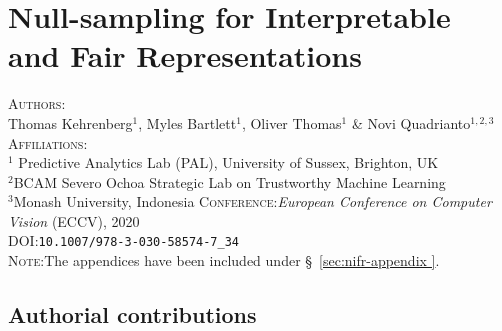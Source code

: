 \chapter{Null-sampling for Interpretable and Fair Representations}\label{ch:nifr}
\textsc{Authors}:\\
%
Thomas Kehrenberg$^1$,
%
Myles Bartlett$^1$,
%
Oliver Thomas$^1$ \&
%
Novi Quadrianto$^{1,2,3}$ \\
%
\textsc{Affiliations}:\\
%
$^1$ Predictive Analytics Lab (PAL), University of Sussex, Brighton, UK\\
%
$^2$BCAM Severo Ochoa Strategic Lab on Trustworthy Machine Learning \\
%
$^3$Monash University, Indonesia 
%
\textsc{Conference}:\;\;\textit{European Conference on Computer Vision} (ECCV), 2020 \\
%
\textsc{DOI}:\;\;\texttt{10.1007/978-3-030-58574-7\_34} \\
%
\textsc{Note}:\;\;The appendices have been included under \S~\ref{sec:nifr-appendix }.
%








\newpage

\clearpage
\section{Authorial contributions}

